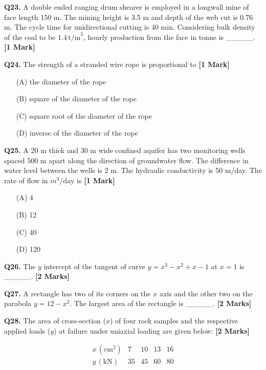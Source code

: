 \documentclass[11pt]{article}
\newcommand{\questiona}[2]{
    \noindent\textbf{Q#2.} #1 \hfill \textbf{[1 Mark]}
}
\newcommand{\questionb}[2]{
    \noindent\textbf{Q#2.} #1 \hfill \textbf{[2 Marks]}
}
\begin{document}
\questiona{A double ended ranging drum shearer is employed in a longwall mine of face length 150 m. The mining height is 3.5 m and depth of the web cut is 0.76 m. The cycle time for unidirectional cutting is 40 min. Considering bulk density of the coal to be \(1.4 \, \text{t/m}^3\), hourly production from the face in tonne is \_\_\_\_\_.}{23}
\vspace{0.5cm}

\questiona{The strength of a stranded wire rope is proportional to}{24}
\begin{enumerate}
    \item[(A)] the diameter of the rope  
    \item[(B)] square of the diameter of the rope  
    \item[(C)] square root of the diameter of the rope  
    \item[(D)] inverse of the diameter of the rope  
\end{enumerate}
\vspace{0.5cm}

\questiona{A 20 m thick and 30 m wide confined aquifer has two monitoring wells spaced 500 m apart along the direction of groundwater flow. The difference in water level between the wells is 2 m. The hydraulic conductivity is 50 m/day. The rate of flow in \( m^3/\text{day} \) is}{25}
\begin{enumerate}
    \item[(A)] 4  
    \item[(B)] 12  
    \item[(C)] 40  
    \item[(D)] 120  
\end{enumerate}
\vspace{0.5cm}

\questionb{The \( y \) intercept of the tangent of curve \( y = x^3 - x^2 + x - 1 \) at \( x = 1 \) is \_\_\_\_\_.}{26}
\vspace{0.5cm}

\questionb{A rectangle has two of its corners on the \( x \) axis and the other two on the parabola \( y = 12 - x^2 \). The largest area of the rectangle is \_\_\_\_\_.}{27}
\vspace{0.5cm}

\questionb{The area of cross-section (\(x\)) of four rock samples and the respective applied loads (\(y\)) at failure under uniaxial loading are given below:}{28}

\[
\begin{array}{c|cccc}
x \, (\text{cm}^2) & 7 & 10 & 13 & 16 \\
\hline
y \, (\text{kN}) & 35 & 45 & 60 & 80 \\
\end{array}
\]
\end{document}
